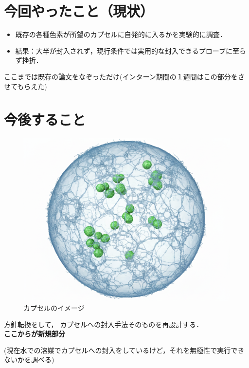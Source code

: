 \documentclass[dvipdfmx]{jsarticle}
\begin{document}
\section{今回やったこと（現状）}
\begin{itemize}
  \item 既存の各種色素が所望のカプセルに自発的に入るかを実験的に調査．
  \item 結果：大半が封入されず，現行条件では実用的な封入できるプローブに至らず挫折．
\end{itemize}
ここまでは既存の論文をなぞっただけ(インターン期間の１週間はこの部分をさせてもらえた)

\section{今後すること}

\begin{figure}
\centering
\vspace{-40pt}
\includegraphics[scale= 0.10]{dotgraph.png} 
\caption{カプセルのイメージ}
\end{figure}

方針転換をして，
カプセルへの封入手法そのものを再設計する． \\
\textbf{ここからが新規部分} \par
(現在水での溶媒でカプセルへの封入をしているけど，それを無極性で実行できないかを調べる)
\end{document}
